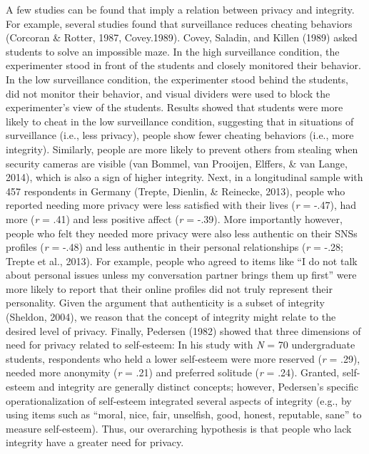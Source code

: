 \documentclass[man,floatsintext]{apa6}
\theoremstyle{definition}
\theoremstyle{definition}
\theoremstyle{definition}
\theoremstyle{remark}
\begin{document}
A few studies can be found that imply a relation between privacy and
integrity. For example, several studies found that surveillance reduces
cheating behaviors (Corcoran \& Rotter, 1987, Covey.1989). Covey,
Saladin, and Killen (1989) asked students to solve an impossible maze.
In the high surveillance condition, the experimenter stood in front of
the students and closely monitored their behavior. In the low
surveillance condition, the experimenter stood behind the students, did
not monitor their behavior, and visual dividers were used to block the
experimenter's view of the students. Results showed that students were
more likely to cheat in the low surveillance condition, suggesting that
in situations of surveillance (i.e., less privacy), people show fewer
cheating behaviors (i.e., more integrity). Similarly, people are more
likely to prevent others from stealing when security cameras are visible
(van Bommel, van Prooijen, Elffers, \& van Lange, 2014), which is also a
sign of higher integrity. Next, in a longitudinal sample with 457
respondents in Germany (Trepte, Dienlin, \& Reinecke, 2013), people who
reported needing more privacy were less satisfied with their lives
(\emph{r} = -.47), had more (\emph{r} = .41) and less positive affect
(\emph{r} = -.39). More importantly however, people who felt they needed
more privacy were also less authentic on their SNSs profiles (\emph{r} =
-.48) and less authentic in their personal relationships (\emph{r} =
-.28; Trepte et al., 2013). For example, people who agreed to items like
\enquote{I do not talk about personal issues unless my conversation
partner brings them up first} were more likely to report that their
online profiles did not truly represent their personality. Given the
argument that authenticity is a subset of integrity (Sheldon, 2004), we
reason that the concept of integrity might relate to the desired level
of privacy. Finally, Pedersen (1982) showed that three dimensions of
need for privacy related to self-esteem: In his study with \emph{N} = 70
undergraduate students, respondents who held a lower self-esteem were
more reserved (\emph{r} = .29), needed more anonymity (\emph{r} = .21)
and preferred solitude (\emph{r} = .24). Granted, self-esteem and
integrity are generally distinct concepts; however, Pedersen's specific
operationalization of self-esteem integrated several aspects of
integrity (e.g., by using items such as \enquote{moral, nice, fair,
unselfish, good, honest, reputable, sane} to measure self-esteem). Thus,
our overarching hypothesis is that people who lack integrity have a
greater need for privacy.
\end{document}
